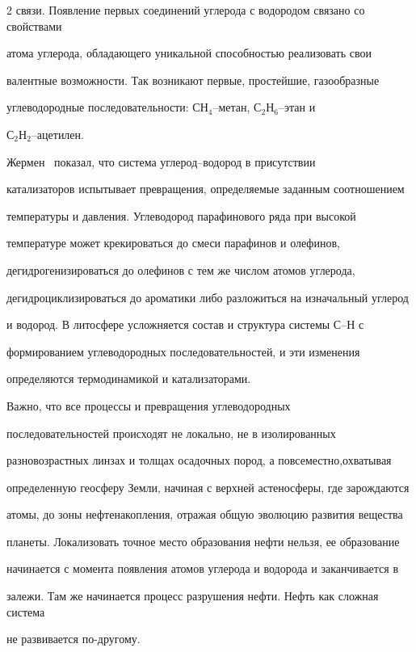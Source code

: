 \begin{multicols}{2}
связи. Появление первых соединений углерода с водородом связано со свойствами 

атома углерода, обладающего уникальной способностью реализовать свои 

валентные возможности. Так возникают первые, простейшие, газообразные 

углеводородные последовательности: СН$_4$--метан, С$_2$Н$_6$--этан и 

С$_2$Н$_2$--ацетилен. 

     

Жермен~\cite{33s} показал, что система углерод--во\-до\-род в присутствии 

катализаторов испытывает превращения, определяемые заданным соотношением 

температуры и давления. Углеводород парафинового ряда при высокой 

температуре может крекироваться до смеси парафинов и олефинов, 

дегидрогенизироваться до олефинов с тем же чис\-лом атомов углерода, 

дегидроциклизироваться до ароматики либо разложиться на изначальный углерод 

и водород. В литосфере усложняется состав и структура системы С--Н с 

формированием углеводородных последовательностей, и эти изменения 

определяются термодинамикой и катализаторами. 

     

     Важно, что все процессы и превращения углеводородных 

последовательностей происходят не локально, не в изолированных 

разновозрастных линзах и толщах осадочных пород, а повсеместно,\linebreak охватывая 

определенную геосферу Земли, начиная с верхней астеносферы, где зарождаются 

атомы, до зоны нефтенакопления, отражая общую эволюцию развития вещества 

планеты. Локализовать точное место образования нефти нельзя, ее образование 

начинается с момента появления атомов углерода и водорода и заканчивается в 

залежи. Там же начинается процесс разрушения нефти. Нефть как сложная система 

не развивается по-другому.


\end{multicols}
